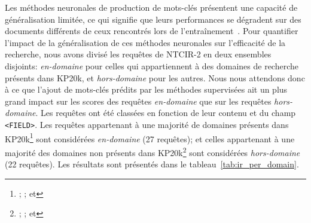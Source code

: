 Les méthodes neuronales de production de mots-clés présentent une capacité de généralisation limitée, ce qui signifie que leurs performances se dégradent sur des documents différents de ceux rencontrés lors de l'entraînement~\cite{weber_fine_2018}.
Pour quantifier l'impact de la généralisation de ces méthodes neuronales sur l'efficacité de la recherche, nous avons divisé les requêtes de NTCIR-2 en deux ensembles disjoints: \textit{en-domaine} pour celles qui appartiennent à des domaines de recherche présents dans KP20k, et \textit{hors-domaine} pour les autres.
Nous nous attendons donc à ce que l'ajout de mots-clés prédits par les méthodes supervisées ait un plus grand impact sur les scores des requêtes \textit{en-domaine} que sur les requêtes \textit{hors-domaine}.
Les requêtes ont été classées en fonction de leur contenu et du champ \texttt{<FIELD>}.
Les requêtes appartenant à une majorité de domaines présents dans KP20k\footnote{; ;  et } sont considérées \textit{en-domaine} (27 requêtes);
et celles appartenant à une majorité des domaines non présents dans KP20k\footnote{; ;  et } sont considérées \textit{hors-domaine} (22 requêtes).
Les résultats sont présentés dans le tableau~\ref{tab:ir_per_domain}.



